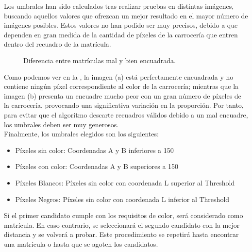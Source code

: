 Los umbrales han sido calculados tras realizar pruebas en distintas imágenes, buscando aquellos valores que ofrezcan un mejor resultado en el mayor número de imágenes posibles. Estos valores no han podido ser muy precisos, debido a que dependen en gran medida de la cantidad de píxeles de la carrocería que entren dentro del recuadro de la matrícula.\\

\begin{figure}[!h]
\centering {}
\caption{\small{Diferencia entre matrículas mal y bien encuadrada.}} \label{DifEncuadre}
\end{figure}

Como podemos ver en la , la imagen (a) está perfectamente encuadrada y no contiene ningún píxel correspondiente al color de la carrocería; mientras que la imagen (b) presenta un encuadre mucho peor con un gran número de píxeles de la carrocería, provocando una significativa variación en la proporción. Por tanto, para evitar que el algoritmo descarte recuadros válidos debido a un mal encuadre, los umbrales deben ser muy generosos.\\

Finalmente, los umbrales elegidos son los siguientes:
\begin{itemize}
\item Píxeles sin color: Coordenadas A y B inferiores a 150
\item Píxeles con color: Coordenadas A y B superiores a 150
\item Píxeles Blancos: Píxeles sin color con coordenada L superior al Threshold
\item Píxeles Negros: Píxeles sin color con coordenada L inferior al Threshold
\end{itemize}


Si el primer candidato cumple con los requisitos de color, será considerado como matrícula. En caso contrario, se seleccionará el segundo candidato con la mejor distancia y se volverá a probar. Este procedimiento se repetirá hasta encontrar una matrícula o hasta que se agoten los candidatos.\\

